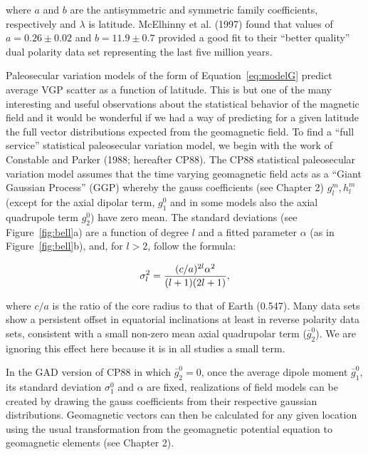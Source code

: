 \noindent where $a$ and $b$ are the antisymmetric and symmetric family coefficients,  respectively and $\lambda$ is latitude.  \nocite{mcfadden88} 
McElhinny et al. (1997) found that values of $a=0.26\pm0.02$ and $b=11.9\pm 0.7$ provided a good fit to their ``better quality'' dual polarity data set representing the last five million years.  \nocite{mcelhinny97}

Paleosecular variation models of the form of Equation~\ref{eq:modelG} predict average VGP scatter as a function of latitude. 
This is but one of the many interesting and useful observations about the statistical behavior of the magnetic field and  it would be wonderful  if we had a way of predicting for a given latitude the full vector distributions expected from the geomagnetic field.    To find a ``full service''  statistical paleosecular variation model, we begin with  the work of 
Constable and Parker (1988;  hereafter CP88).   \nocite{constable88}
  The CP88 statistical paleosecular variation model assumes that the time varying geomagnetic field acts as a ``Giant Gaussian Process'' (GGP) whereby the gauss coefficients (see Chapter 2)   $g_l^m, h_l^m$  (except for the axial dipolar term, $g_1^0$ and in some models also the axial quadrupole term $g_2^0$) have zero mean.  The standard deviations (see Figure~\ref{fig:bell}a)  are a function of degree $l$ and   a fitted parameter $\alpha$ (as in Figure~\ref{fig:bell}b), and, for $l>2$,  follow the formula:
  
  \begin{equation}
{\sigma_l^2 } = { { (c/a)^{2l} \alpha^2}\over {(l+1)(2l+1)} },
\label{eq:sigma1}
\end{equation}

\noindent where $c/a$ is the ratio of the core radius to that of  Earth (0.547).   Many data sets show a persistent offset in equatorial inclinations  at least in reverse polarity data sets, consistent with a small non-zero mean axial quadrupolar term ($\bar g_2^0$).   We are ignoring this effect here because it is in all studies a small term.    
 



In the GAD version of CP88 in which $\bar{g}_2^0=0$, once  the average dipole moment $\bar g_1^0$, its standard deviation $\sigma_1^0$ and $\alpha$ are fixed,  realizations of field models can be created by drawing the gauss coefficients from their respective gaussian distributions.  Geomagnetic vectors can then be calculated for any given location using the usual transformation from the geomagnetic potential equation to geomagnetic elements (see Chapter 2).  


